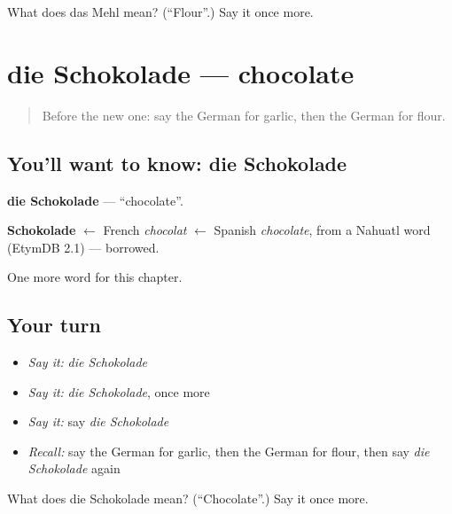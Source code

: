 \begin{tcolorbox}[breakable,colback=teal!4,colframe=teal!35!black,title={Before you move on}]
What does das Mehl mean? (\textquotedblleft{}Flour\textquotedblright{}.) Say it once more.
\end{tcolorbox}
\section[die Schokolade]{die Schokolade — chocolate}

\label{lesson:GE-C122-schokolade}



\begin{quote}
Before the new one: say the German for garlic, then the German for flour.
\end{quote}

\subsection*{You'll want to know: die Schokolade}
\textbf{die Schokolade} — \textquotedblleft{}chocolate\textquotedblright{}.

\begin{cousinweb}
\textbf{Schokolade} $\leftarrow$ French \emph{chocolat} $\leftarrow$ Spanish \emph{chocolate}, from a Nahuatl word (EtymDB 2.1) — borrowed.
\end{cousinweb}

\begin{grammarlens}[title={What you've built}]
One more word for this chapter.
\end{grammarlens}

\subsection*{Your turn}
\begin{itemize}
\raggedright
  \item \emph{Say it:} \emph{die Schokolade}
  \item \emph{Say it:} \emph{die Schokolade}, once more
  \item \emph{Say it:} say \emph{die Schokolade}
  \item \emph{Recall:} say the German for garlic, then the German for flour, then say \emph{die Schokolade} again
\end{itemize}

\begin{tcolorbox}[breakable,colback=teal!4,colframe=teal!35!black,title={Before you move on}]
What does die Schokolade mean? (\textquotedblleft{}Chocolate\textquotedblright{}.) Say it once more.
\end{tcolorbox}
